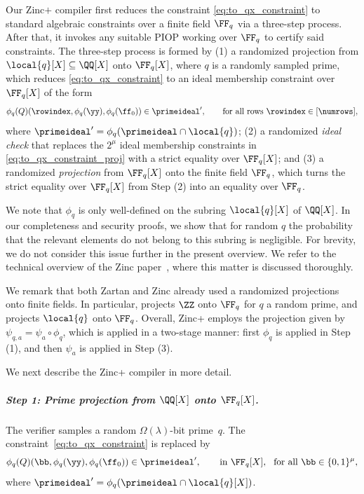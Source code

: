 Our Zinc$+$ compiler first reduces the constraint \eqref{eq:to_qx_constraint} to standard algebraic constraints over a finite field $\FF_q$ via a three-step process. After that, it invokes any suitable PIOP working over $\FF_q$ to certify said constraints. The three-step process is formed by (1) a randomized projection from  $\local{q}[X]\subseteq \QQ[X]$ onto $\FF_q[X]$, where $q$ is a randomly sampled prime, which reduces \eqref{eq:to_qx_constraint} to an ideal membership constraint over $\FF_q[X]$ of the form 
\begin{equation}\label{eq:to_qx_constraint_proj}
\phi_q(Q)(\rowindex, \phi_q(\yy), \phi_q(\ff_0))\in \primeideal', \qquad \text{for all rows } \rowindex\in [\numrows],
\end{equation} 
where  $\primeideal' = \phi_q(\primeideal\cap \local{q})$;
%
(2) a randomized \emph{ideal check} that replaces the $2^\mu$ ideal membership constraints in \eqref{eq:to_qx_constraint_proj} with a strict equality over $\FF_q[X]$; and (3) a randomized \emph{projection} from $\FF_q[X]$ onto the finite field $\FF_q$, which turns the strict equality over $\FF_q[X]$ from Step (2) into an equality over $\FF_q$.  




We note that $\phi_{q}$ is only well-defined on the subring $\local{q}[X]$ of $\QQ[X]$. In our completeness and security proofs, we show that for random $q$ the probability that the relevant elements do not belong to this subring is negligible.   For brevity, we do not consider this issue further in the present overview. We refer to the technical overview of the Zinc paper~\cite{Zinc}, where this matter is discussed thoroughly.



We remark that both Zartan \cite{Zartan} and Zinc \cite{Zinc} already used a randomized projections onto finite fields. In particular, \cite{Zartan} projects $\ZZ$ onto $\FF_q$ for $q$ a random prime, and \cite{Zinc} projects $\local{q}$ onto $\FF_q$. Overall, Zinc+ employs the projection given by $\psi_{q,a} = \psi_a \circ \phi_q$, which is applied in a two-stage manner: first $\phi_q$ is applied in Step (1), and then $\psi_a$ is applied in Step (3). 

\medskip


We next describe the Zinc+ compiler in more detail.

\subparagraph{Step 1: Prime projection from $\QQ[X]$ onto $\FF_q[X]$.}

The verifier samples a random $\Omega(\lambda)$-bit prime~$q$. The constraint~\eqref{eq:to_qx_constraint} is replaced by 
\[
\phi_q(Q)(\bb, \phi_q(\yy), \phi_q(\ff_0)) \in \primeideal', \qquad \text{in } \FF_q[X],\ \text{ for all } \bb\in\{0,1\}^\mu,
\]
where $\primeideal' = \phi_q(\primeideal \cap \local{q}[X])$.

